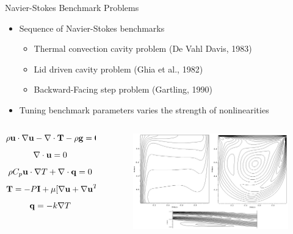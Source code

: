 \documentclass{beamer}
\begin{document}
\begin{frame}{Navier-Stokes Benchmark Problems}

  \begin{itemize}
  \item Sequence of Navier-Stokes benchmarks
    \begin{itemize}
    \item Thermal convection cavity problem (De Vahl Davis, 1983)
    \item Lid driven cavity problem (Ghia et al., 1982)
    \item Backward-Facing step problem (Gartling, 1990)
    \end{itemize}
    \medskip
  \item Tuning benchmark parameters varies the strength of
    nonlinearities
    \medskip
  \end{itemize}

  \begin{columns}
    \begin{column}{0.4\textwidth}
      {\small
      \[
      \rho \mathbf{u} \cdot \nabla \mathbf{u} - \nabla \cdot \mathbf{T} - \rho
      \mathbf{g} = \mathbf{0}
      \]
      \[
      \nabla \cdot \mathbf{u} = 0
      \]
      \[
      \rho C_p \mathbf{u} \cdot \nabla T + \nabla \cdot \mathbf{q} = 0
      \]
      \[
      \mathbf{T} = -P \mathbf{I} + \mu[\nabla \mathbf{u} + \nabla \mathbf{u}^T]
      \]
      \[
      \mathbf{q} = - k \nabla T
      \]
      }
    \end{column}

    \begin{column}{0.6\textwidth}

      \begin{figure}[htpb!]
        \begin{center}
          \includegraphics[width=2.9in]{benchmark_solutions.png}
        \end{center}
      \end{figure}

    \end{column}
  \end{columns}

\end{frame}
\end{document}
